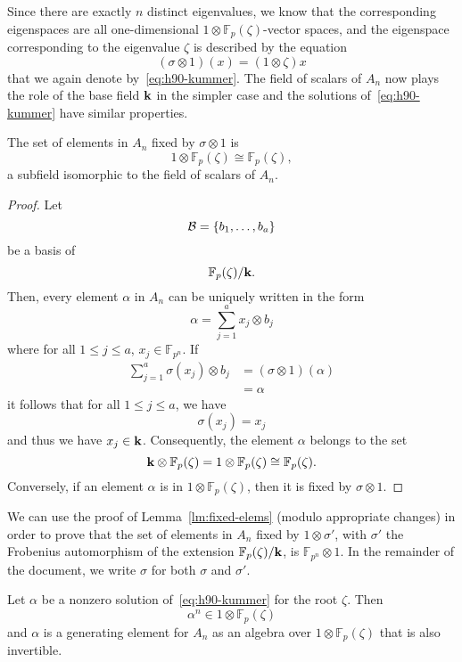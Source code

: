 Since there are exactly $n$ distinct eigenvalues, we know that the
corresponding eigenspaces are all one-dimensional
$1\otimes\mathbb{F}_{p}(\zeta)$-vector spaces, and the eigenspace corresponding
to the eigenvalue $\zeta$ is described by the equation
 \begin{equation}
   \tag{H90}
   (\sigma\otimes1)(x) = (1\otimes\zeta) x
   \label{eq:h90-kummer}
 \end{equation}
 that we again denote by~\eqref{eq:h90-kummer}. The field of scalars of $A_n$ now
 plays the role of the base field $\mathbf{k}$ in the simpler case and the solutions
 of~\eqref{eq:h90-kummer} have similar properties.
 \begin{lm}
   \label{lm:fixed-elems}
   The set of elements in $A_n$ fixed by $\sigma\otimes1$ is
   \[
     1\otimes\mathbb{F}_{p}(\zeta)\cong \mathbb{F}_{p}(\zeta),
   \]
   a subfield isomorphic to the field of scalars of $A_n$.
 \end{lm}
 \begin{proof}
   Let 
   \[
     \mathcal{B} = \left\{ b_1, \dots, b_a \right\}
   \]
   be a basis of
   \[
     \mathbb{F}_p(\zeta)/\mathbf{k}.
   \]
   Then, every element $\alpha$ in $A_n$ can be uniquely written in the form
   \[
     \alpha = \sum_{j=1}^a x_j\otimes b_j
   \]
   where for all $1\leq j\leq a$, $x_j\in\mathbb{F}_{p^n}$. If 
   \begin{align*}
     \sum_{j=1}^a\sigma(x_j)\otimes b_j &= (\sigma\otimes1)(\alpha)\\
     &= \alpha
   \end{align*}
 it follows that for all $1\leq j\leq a$, we have
   \[
     \sigma(x_j) = x_j
   \]
   and thus we have $x_j\in\mathbf{k}$. Consequently, the element $\alpha$ belongs to
   the set
   \[
     \mathbf{k}\otimes\mathbb{F}_{p}(\zeta) =
     1\otimes\mathbb{F}_p(\zeta)\cong\mathbb{F}_p(\zeta).
   \]
   Conversely, if an element $\alpha$ is in $1\otimes\mathbb{F}_{p}(\zeta)$,
   then it is fixed by $\sigma\otimes1$.
 \end{proof}
 \begin{rem}
   \label{rem:fixed-elems}
   We can use the proof of Lemma~\ref{lm:fixed-elems} (modulo appropriate
   changes) in order to prove that the set of elements in $A_n$ fixed by
   $1\otimes\sigma'$, with $\sigma'$ the Frobenius automorphism of the extension
   $\mathbb{F}_{p}(\zeta)/\mathbf{k}$, is $\mathbb{F}_{p^n}\otimes1$. In the remainder
   of the document, we write $\sigma$ for both $\sigma$ and $\sigma'$.
 \end{rem}
 \begin{lm}
   \label{lm:h90-solutions}
   Let $\alpha$ be a nonzero solution of~\eqref{eq:h90-kummer} for the root
   $\zeta$. Then 
   \[
     \alpha^n\in 1\otimes\mathbb{F}_{p}(\zeta)
   \]
   and $\alpha$ is a generating element for $A_n$ as an algebra over
   $1\otimes\mathbb{F}_{p}(\zeta)$ that is also invertible.
 \end{lm}
